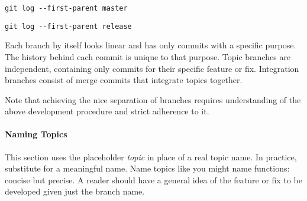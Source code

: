 \begin{verbatim}
git log --first-parent master
\end{verbatim}

\begin{figure}
\centering
{}
\label{fig:ParentCommitInMasterBranch}
\end{figure}

\begin{verbatim}
git log --first-parent release
\end{verbatim}


\begin{figure}
\centering
{}
\label{fig:ParentCommitInReleaseBranch}
\end{figure}

Each branch by itself looks linear and has only commits with a specific purpose.
The history behind each commit is unique to that purpose. Topic branches are
independent, containing only commits for their specific feature or fix.
Integration branches consist of merge commits that integrate topics together.

Note that achieving the nice separation of branches requires understanding of
the above development procedure and strict adherence to it.


\paragraph{Naming Topics}
\label{par:NamingTopics}

This section uses the placeholder \textit{topic} in place of a real topic name.
In practice, substitute for a meaningful name. Name topics like you might name
functions: concise but precise. A reader should have a general idea of the
feature or fix to be developed given just the branch name.

